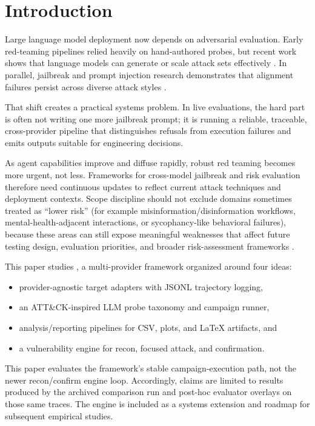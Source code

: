 \section{Introduction}
\label{sec:introduction}

Large language model deployment now depends on adversarial evaluation. Early
red-teaming pipelines relied heavily on hand-authored probes, but recent work
shows that language models can generate or scale attack sets effectively
\citep{perez2022redteaming,radharapu2023aart}. In parallel, jailbreak and prompt
injection research demonstrates that alignment failures persist across diverse
attack styles \citep{wei2023jailbroken,zou2023universal,yu2024dontlisten}.

That shift creates a practical systems problem. In live evaluations, the hard
part is often not writing one more jailbreak prompt; it is running a reliable,
traceable, cross-provider pipeline that distinguishes refusals from execution
failures and emits outputs suitable for engineering decisions.

As agent capabilities improve and diffuse rapidly, robust red teaming becomes
more urgent, not less. Frameworks for cross-model jailbreak and risk evaluation
therefore need continuous updates to reflect current attack techniques and
deployment contexts. Scope discipline should not exclude domains sometimes
treated as ``lower risk'' (for example misinformation/disinformation workflows,
mental-health-adjacent interactions, or sycophancy-like behavioral failures),
because these areas can still expose meaningful weaknesses that affect future
testing design, evaluation priorities, and broader risk-assessment frameworks
\citep{perez2022redteaming,radharapu2023aart,mazeika2024harmbench}.

This paper studies \system, a multi-provider framework organized around four
ideas:
\begin{itemize}
\item provider-agnostic target adapters with JSONL trajectory logging,
\item an ATT\&CK-inspired LLM probe taxonomy and campaign runner,
\item analysis/reporting pipelines for CSV, plots, and LaTeX artifacts, and
\item a vulnerability engine for recon, focused attack, and confirmation.
\end{itemize}

This paper evaluates the framework's stable campaign-execution path, not the
newer recon/confirm engine loop. Accordingly, claims are limited to results
produced by the archived comparison run and post-hoc evaluator overlays on
those same traces. The engine is included as a systems extension and roadmap
for subsequent empirical studies.

